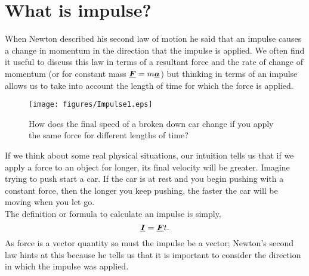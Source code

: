 




\addtolength{\topmargin}{-0.7 cm}
\setlength{\columnsep}{22pt}


\section{What is impulse?}
When Newton described his second law of motion he said that an impulse causes a change in momentum in the direction that the impulse is applied.  We often find it useful to discuss this law in terms of a resultant force and the rate of change of momentum (or for constant mass ${\mathit{\underline{\boldsymbol{F}}}}=m{\mathit{\underline{\boldsymbol{a}}}}$) but thinking in terms of an impulse allows us to take into account the length of time for which the force is applied.\\

\begin{wrapfigure}{r}{7cm}
\center
\texttt{[image: figures/Impulse1.eps]}
\caption{How does the final speed of a broken down car change if you apply the same force for different lengths of time?}\vspace{1.0cm}
\end{wrapfigure} 

\noindent If we think about some real physical situations, our intuition tells us that if we apply a force to an object for longer, its final velocity will be greater.  Imagine trying to push start a car.  If the car is at rest and you begin pushing with a constant force, then the longer you keep pushing, the faster the car will be moving when you let go.\\

\noindent The definition or formula to calculate an impulse is simply,
\begin{equation}
{\mathit{\underline{\boldsymbol{I}}}}={\mathit{\underline{\boldsymbol{F}}}}{t}.
\end {equation}
As force is a vector quantity so must the impulse be a vector; Newton's second law hints at this because he tells us that it is important to consider the direction in which the impulse was applied.


